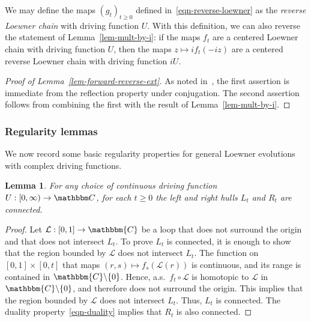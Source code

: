 \documentclass[11pt]{article}
\theoremstyle{plain}
\newtheorem{lem}[thm]{Lemma}
\theoremstyle{definition}
\numberwithin{equation}{section}
\newcommand{\BB}{\mathbbm}
\newcommand{\rta}{\rightarrow}
\newcommand{\mcl}{\mathcal}
\begin{document}
We may define the maps $(g_t)_{t \geq 0}$ defined in~\eqref{eqn-reverse-loewner} as the \emph{reverse Loewner chain} with driving function $U$.  With this definition, we can also reverse the statement of Lemma~\ref{lem-mult-by-i}: if the maps $f_t$ are a centered Loewner chain with driving function $U$, then the maps $z\mapsto i f_t(-iz)$ are a centered reverse Loewner chain with driving function $i U $.
 

\begin{proof}[Proof of Lemma~\ref{lem-forward-reverse-ext}]
As noted in~\cite[Section 2]{lu-complex-loewner}, the first assertion is immediate from the reflection property under conjugation. The second assertion follows from combining the first with the result of Lemma~\ref{lem-mult-by-i}.
\end{proof}

 


\subsubsection{Regularity lemmas}

We now record some basic regularity properties for general Loewner evolutions with complex driving functions. 

\begin{lem} \label{lem-connected}
For any choice of continuous driving function $U : [0,\infty)\rta\BB C$, for each $t\geq 0$ the left and right hulls $L_t$ and $R_t$ are connected. 
\end{lem}
\begin{proof}
Let $\mcl L: [0,1] \rta \BB{C}$ be a loop that does not surround the origin and that does not intersect $L_t$. To prove $L_t$ is connected, it is enough to show that the region bounded by $\mcl L$ does not intersect $L_t$. The function on $[0,1] \times [0,t]$ that maps $(r,s) \mapsto f_s(\mcl L(r))$ is  continuous, and its range is contained in $\BB{C} \backslash \{0\}$.  Hence, a.s.\ $f_t \circ \mcl L$ is homotopic to $\mcl L$ in $\BB{C} \backslash \{0\}$, and therefore does not surround the origin.  This implies that the region bounded by $\mcl L$ does not intersect $L_t$.  Thus, $L_t$ is connected. The duality property~\eqref{eqn-duality} implies that $R_t$ is also connected.
\end{proof}
\end{document}
